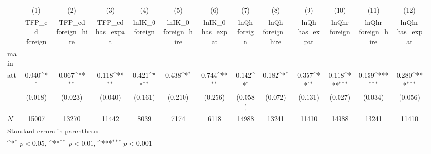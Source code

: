 {
\def\sym#1{\ifmmode^{#1}\else\(^{#1}\)\fi}
\begin{tabular}{l*{12}{c}}
\hline\hline
            &\multicolumn{1}{c}{(1)}&\multicolumn{1}{c}{(2)}&\multicolumn{1}{c}{(3)}&\multicolumn{1}{c}{(4)}&\multicolumn{1}{c}{(5)}&\multicolumn{1}{c}{(6)}&\multicolumn{1}{c}{(7)}&\multicolumn{1}{c}{(8)}&\multicolumn{1}{c}{(9)}&\multicolumn{1}{c}{(10)}&\multicolumn{1}{c}{(11)}&\multicolumn{1}{c}{(12)}\\
            &\multicolumn{1}{c}{TFP\_cd  foreign}&\multicolumn{1}{c}{TFP\_cd  foreign\_hire}&\multicolumn{1}{c}{TFP\_cd  has\_expat}&\multicolumn{1}{c}{lnIK\_0  foreign}&\multicolumn{1}{c}{lnIK\_0  foreign\_hire}&\multicolumn{1}{c}{lnIK\_0  has\_expat}&\multicolumn{1}{c}{lnQh  foreign}&\multicolumn{1}{c}{lnQh  foreign\_hire}&\multicolumn{1}{c}{lnQh  has\_expat}&\multicolumn{1}{c}{lnQhr  foreign}&\multicolumn{1}{c}{lnQhr  foreign\_hire}&\multicolumn{1}{c}{lnQhr  has\_expat}\\
\hline
main        &                     &                     &                     &                     &                     &                     &                     &                     &                     &                     &                     &                     \\
att         &       0.040\sym{*}  &       0.067\sym{**} &       0.118\sym{**} &       0.421\sym{**} &       0.438\sym{*}  &       0.744\sym{**} &       0.142\sym{*}  &       0.182\sym{*}  &       0.357\sym{**} &       0.118\sym{***}&       0.159\sym{***}&       0.280\sym{***}\\
            &     (0.018)         &     (0.023)         &     (0.040)         &     (0.161)         &     (0.210)         &     (0.256)         &     (0.058)         &     (0.072)         &     (0.131)         &     (0.027)         &     (0.034)         &     (0.056)         \\
\hline
\(N\)       &       15007         &       13270         &       11442         &        8039         &        7174         &        6118         &       14988         &       13241         &       11410         &       14988         &       13241         &       11410         \\
\hline\hline
\multicolumn{13}{l}{\footnotesize Standard errors in parentheses}\\
\multicolumn{13}{l}{\footnotesize \sym{*} \(p<0.05\), \sym{**} \(p<0.01\), \sym{***} \(p<0.001\)}\\
\end{tabular}
}
